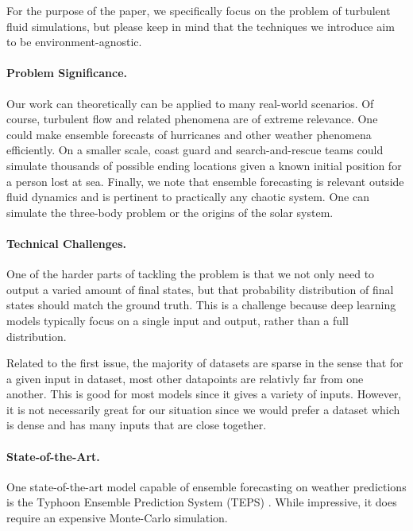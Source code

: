 \documentclass{article}
\begin{document}
    For the purpose of the paper, we specifically focus on the problem of turbulent fluid simulations, but please keep in mind that the techniques we introduce aim to be environment-agnostic.

    \paragraph{Problem Significance.}

    Our work can theoretically can be applied to many real-world scenarios. Of course, turbulent flow and related phenomena are of extreme relevance. One could make ensemble forecasts of hurricanes and other weather phenomena efficiently. On a smaller scale, coast guard and search-and-rescue teams could simulate thousands of possible ending locations given a known initial position for a person lost at sea. Finally, we note that ensemble forecasting is relevant outside fluid dynamics and is pertinent to practically any chaotic system. One can simulate the three-body problem or the origins of the solar system.

    \paragraph{Technical Challenges.}

    One of the harder parts of tackling the problem is that we not only need to output a varied amount of final states, but that probability distribution of final states should match the ground truth. This is a challenge because deep learning models typically focus on a single input and output, rather than a full distribution.

    Related to the first issue, the majority of datasets are sparse in the sense that for a given input in dataset, most other datapoints are relativly far from one another. This is good for most models since it gives a variety of inputs. However, it is not necessarily great for our situation since we would prefer a dataset which is dense and has many inputs that are close together.

    \paragraph{State-of-the-Art.}
    One state-of-the-art model capable of ensemble forecasting on weather predictions is the Typhoon Ensemble Prediction System (TEPS) \cite{TyphoonEnsemblePredictionSystemDevelopedattheJapanMeteorologicalAgency}. While impressive, it does require an expensive Monte-Carlo simulation.
\end{document}
